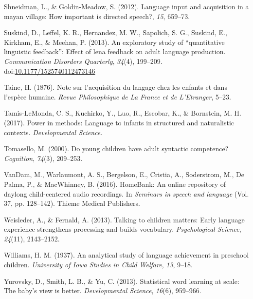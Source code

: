 \documentclass[man]{apa6}
\theoremstyle{definition}
\theoremstyle{definition}
\theoremstyle{definition}
\theoremstyle{remark}
\begin{document}
\hypertarget{ref-shneidman2012language}{}
Shneidman, L., \& Goldin-Meadow, S. (2012). Language input and
acquisition in a mayan village: How important is directed speech?,
\emph{15}, 659--73.

\hypertarget{ref-suskind2013exploratory}{}
Suskind, D., Leffel, K. R., Hernandez, M. W., Sapolich, S. G., Suskind,
E., Kirkham, E., \& Meehan, P. (2013). An exploratory study of
``quantitative linguistic feedback'': Effect of lena feedback on adult
language production. \emph{Communication Disorders Quarterly},
\emph{34}(4), 199--209.
doi:\href{https://doi.org/10.1177/1525740112473146}{10.1177/1525740112473146}

\hypertarget{ref-taine1876note}{}
Taine, H. (1876). Note sur l'acquisition du langage chez les enfants et
dans l'espèce humaine. \emph{Revue Philosophique de La France et de
L'Etranger}, 5--23.

\hypertarget{ref-tamis2017power}{}
Tamis-LeMonda, C. S., Kuchirko, Y., Luo, R., Escobar, K., \& Bornstein,
M. H. (2017). Power in methods: Language to infants in structured and
naturalistic contexts. \emph{Developmental Science}.

\hypertarget{ref-tomasello2000young}{}
Tomasello, M. (2000). Do young children have adult syntactic competence?
\emph{Cognition}, \emph{74}(3), 209--253.

\hypertarget{ref-vandam2016homebank}{}
VanDam, M., Warlaumont, A. S., Bergelson, E., Cristia, A., Soderstrom,
M., De Palma, P., \& MacWhinney, B. (2016). HomeBank: An online
repository of daylong child-centered audio recordings. In \emph{Seminars
in speech and language} (Vol. 37, pp. 128--142). Thieme Medical
Publishers.

\hypertarget{ref-weisleder2013talking}{}
Weisleder, A., \& Fernald, A. (2013). Talking to children matters: Early
language experience strengthens processing and builds vocabulary.
\emph{Psychological Science}, \emph{24}(11), 2143--2152.

\hypertarget{ref-williams1937analytical}{}
Williams, H. M. (1937). An analytical study of language achievement in
preschool children. \emph{University of Iowa Studies in Child Welfare},
\emph{13}, 9--18.

\hypertarget{ref-yurovsky2013statistical}{}
Yurovsky, D., Smith, L. B., \& Yu, C. (2013). Statistical word learning
at scale: The baby's view is better. \emph{Developmental Science},
\emph{16}(6), 959--966.
\end{document}
